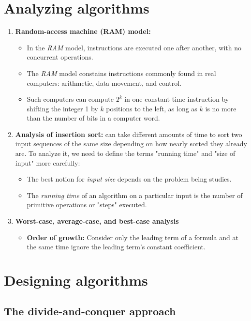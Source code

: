\documentclass{report}
\begin{document}
\section{Analyzing algorithms}
\begin{enumerate}[leftmargin=*]
    \item \textbf{Random-access machine (RAM) model:} 
    \begin{itemize}
        \item In the \emph{RAM} model, instructions are executed one after another, with no concurrent operations.
        \item The \emph{RAM} model constains instructions commonly found in real computers: arithmetic, data movement, and control.
        \item Such computers can compute $2^k$ in one constant-time instruction by shifting the integer 1 by $k$ positions to the left, as long as $k$ is no more than the number of bits in a computer word.
    \end{itemize}
    \item \textbf{Analysis of insertion sort:}  can take different amounts of time to sort two input sequences of the same size depending on how nearly sorted they already are. To analyze it, we need to define the terms "running time" and "size of input" more carefully:
    \begin{itemize}
        \item The best notion for \emph{input size} depends on the problem being studies. 
        \item The \emph{running time} of an algorithm on a particular input is the number of primitive operations or "steps" executed.
    \end{itemize}
    \item \textbf{Worst-case, average-case, and best-case analysis}
    \begin{itemize}
        \item \textbf{Order of growth:} Consider only the leading term of a formula and at the same time ignore the leading term's constant coefficient.
    \end{itemize}
\end{enumerate}

\section{Designing algorithms}
\subsection{The divide-and-conquer approach}
\end{document}
